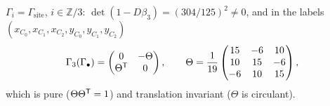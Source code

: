 \begin{proposition}\label{prop:three}
 $\Gamma_i=\Gamma_{\mathrm{site}}$, $i\in\mathbb Z/3$:
$\det(1-D\beta_3)=(304/125)^2\neq0$, and in the labels $(x_{C_0},x_{C_1},x_{C_2},y_{C_0},y_{C_1},y_{C_2})$
\[
 \Gamma_3(\Gamma_\bullet)=\begin{pmatrix}0&-\Theta\\\Theta^{\mathsf T}&0\end{pmatrix},\qquad
 \Theta=\frac1{19}\begin{pmatrix}15&-6&10\\10&15&-6\\-6&10&15\end{pmatrix},
\]
which is pure ($\Theta\Theta^{\mathsf T}=1$) and translation invariant ($\Theta$ is circulant).
\end{proposition}
